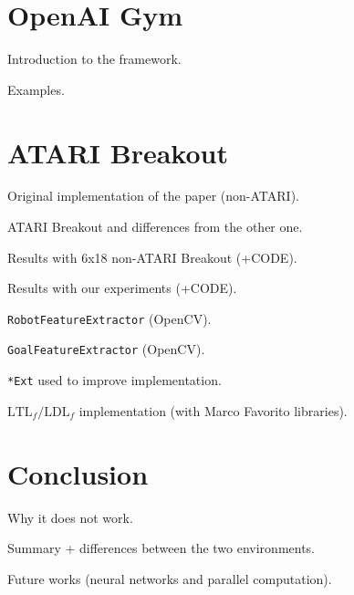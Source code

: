 \documentclass[a4paper]{article}
\begin{document}
\clearpage
\section{OpenAI Gym}
Introduction to the framework.

Examples.

\clearpage
\section{ATARI Breakout}
Original implementation of the paper (non-ATARI).

ATARI Breakout and differences from the other one.

Results with 6x18 non-ATARI Breakout (+CODE).

Results with our experiments (+CODE).

\texttt{RobotFeatureExtractor} (OpenCV).

\texttt{GoalFeatureExtractor} (OpenCV).

\texttt{*Ext} used to improve implementation.

$\text{LTL}_f/\text{LDL}_f$ implementation (with Marco Favorito libraries).

\clearpage
\section{Conclusion}
Why it does not work.

Summary + differences between the two environments.

Future works (neural networks and parallel computation).


\clearpage







\end{document}
